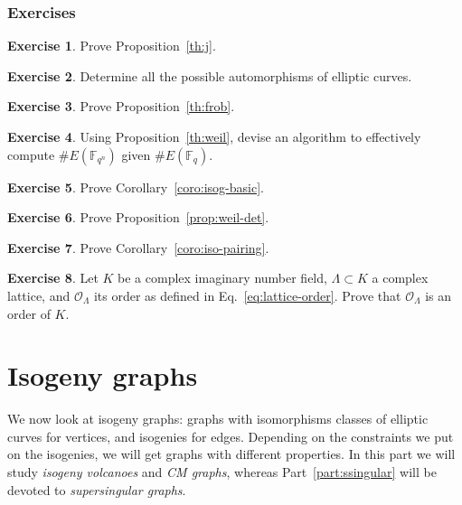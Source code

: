 \documentclass[10pt]{article}
\theoremstyle{plain}
\theoremstyle{definition}
\newtheorem{exercise}{Exercise}[part]
\def\F{\ensuremath{\mathbb{F}}}
\def\O{\ensuremath{\mathcal{O}}}
\begin{document}
\begin{prposition}
\section*{Exercises}

\begin{exercise}
  Prove Proposition~\ref{th:j}.
\end{exercise}

\begin{exercise}
  Determine all the possible automorphisms of elliptic curves.
\end{exercise}

\begin{exercise}
  Prove Proposition~\ref{th:frob}.
\end{exercise}

\begin{exercise}
  Using Proposition~\ref{th:weil}, devise an algorithm to effectively
  compute $\#E(\F_{q^n})$ given $\#E(\F_q)$.
\end{exercise}

\begin{exercise}
  Prove Corollary~\ref{coro:isog-basic}.
\end{exercise}

\begin{exercise}
  Prove Proposition~\ref{prop:weil-det}.
\end{exercise}

\begin{exercise}
  Prove Corollary~\ref{coro:iso-pairing}.
\end{exercise}

\begin{exercise}
  Let $K$ be a complex imaginary number field, $Λ⊂K$ a complex
  lattice, and $\O_Λ$ its order as defined in
  Eq.~\eqref{eq:lattice-order}. %
  Prove that $\O_Λ$ is an order of $K$.
\end{exercise}



\clearpage
\part{Isogeny graphs}

We now look at isogeny graphs: graphs with isomorphisms classes of
elliptic curves for vertices, and isogenies for edges. %
Depending on the constraints we put on the isogenies, we will get
graphs with different properties. %
In this part we will study \emph{isogeny volcanoes} and \emph{CM graphs},
whereas Part~\ref{part:ssingular} will be devoted to
\emph{supersingular graphs}.


\end{prposition}
\end{document}
